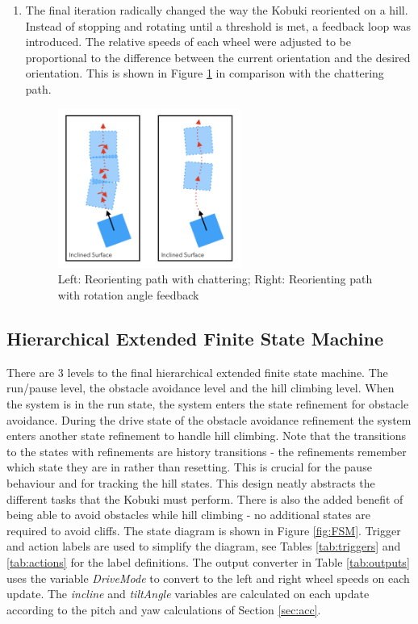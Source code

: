 \begin{enumerate}
    \item The final iteration radically changed the way the Kobuki reoriented on a hill. Instead of stopping and rotating until a threshold is met, a feedback loop was introduced. The relative speeds of each wheel were adjusted to be proportional to the difference between the current orientation and the desired orientation. This is shown in Figure \ref{fig:hillARC} in comparison with the chattering path.
    \begin{figure}[H]
        \centering
        \includegraphics[width=6cm]{Images/ChatterVSArc.png}
        \vspace{-0.2cm}
        \caption{Left: Reorienting path with chattering; Right: Reorienting path with rotation angle feedback}
        \label{fig:hillARC}
    \end{figure}
\end{enumerate}

\subsection{Hierarchical Extended Finite State Machine}\label{sec:FSM}
\vspace{-0.2cm} There are 3 levels to the final hierarchical extended finite state machine. The run/pause level, the obstacle avoidance level and the hill climbing level. When the system is in the run state, the system enters the state refinement for obstacle avoidance. During the drive state of the obstacle avoidance refinement the system enters another state refinement to handle hill climbing. Note that the transitions to the states with refinements are history transitions - the refinements remember which state they are in rather than resetting. This is crucial for the pause behaviour and for tracking the hill states. This design neatly abstracts the different tasks that the Kobuki must perform. There is also the added benefit of being able to avoid obstacles while hill climbing - no additional states are required to avoid cliffs. The state diagram is shown in Figure \ref{fig:FSM}. Trigger and action labels are used to simplify the diagram, see Tables \ref{tab:triggers} and \ref{tab:actions} for the label definitions. The output converter in Table \ref{tab:outputs} uses the variable \textit{DriveMode} to convert to the left and right wheel speeds on each update. The \textit{incline} and \textit{tiltAngle} variables are calculated on each update according to the pitch and yaw calculations of Section \ref{sec:acc}. %



